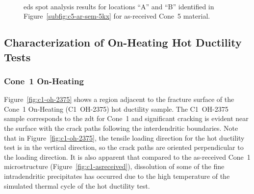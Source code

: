 {\begin{figure}
    \centering
     \\
    \caption[]{\Gls{eds} spot analysis results for locations ``A'' and ``B'' identified in Figure~\ref{subfig:c5-ar-sem-5kx} for as-received Cone~5 material.}
    \label{fig:c5-ar-eds}
\end{figure}

\clearpage


\subsection{Characterization of On-Heating Hot Ductility Tests}
\subsubsection{Cone~1 On-Heating}
Figure~\ref{fig:c1-oh-2375} shows a region adjacent to the fracture surface of the Cone~1 On-Heating  (C1~OH-2375) hot ductility sample. The C1~OH-2375 sample corresponds to the \gls{zdt} for Cone~1 and significant cracking is evident near the surface with the crack paths following the interdendritic boundaries. Note that in Figure~\ref{fig:c1-oh-2375}, the tensile loading direction for the hot ductility test is in the vertical direction, so the crack paths are oriented perpendicular to the loading direction. It is also apparent that compared to the as-received Cone~1 microstructure (Figure~\ref{fig:c1-asreceived}), dissolution of some of the fine intradendritic precipitates has occurred due to the high temperature of the simulated thermal cycle of the hot ductility test.

}
